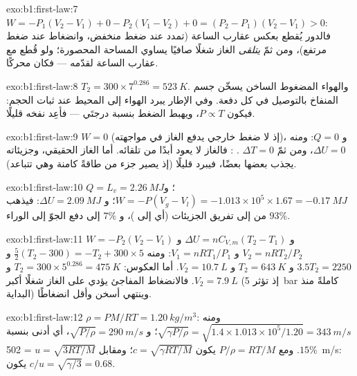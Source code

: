 \begin{solution}{exo:b1:first-law:7}
$W = -P_1(V_2 - V_1) + 0 - P_2(V_1 - V_2) + 0 = (P_2 - P_1)(V_2 - V_1) > 0$:
فالدور يُقطع بعكس عقارب الساعة (تمدد عند ضغط منخفض،
وانضغاط عند ضغط مرتفع)، ومن ثمّ \emph{يتلقى} الغاز شغلًا صافيًا يساوي
المساحة المحصورة؛ ولو قُطع مع عقارب الساعة لقدّمه --- فكان محركًا.
\end{solution}

\begin{solution}{exo:b1:first-law:8}
$T_2 = 300 \times 7^{0.286} = \qty{523}{K}$. والهواء المضغوط الساخن يسخّن
جسم المنفاخ بالتوصيل في كل دفعة. وفي الإطار يبرد الهواء إلى
 المحيط عند ثبات الحجم: فيكون $P \propto T$، ويهبط الضغط بنسبة
درجتَي  --- فأعِد نفخه قليلًا.
\end{solution}

\begin{solution}{exo:b1:first-law:9}
$W = 0$ (إذ لا ضغط خارجي يدفع الغاز في مواجهته)، و $Q = 0$: ومنه $\Delta U = 0$،
ومن ثمّ $\Delta T = 0$ . : فالغاز لا يعود
أبدًا من تلقائه. أما الغاز الحقيقي، وجزيئاته يجذب بعضها بعضًا، فيبرد قليلًا
(إذ يصير جزء من  طاقةً كامنة وهي تتباعد).
\end{solution}

\begin{solution}{exo:b1:first-law:10}
$Q = L_v = \qty{2.26}{MJ}$؛ و $W = -P(V_g - V_l) = -1.013\times10^5 \times 1.67 =
\qty{-0.17}{MJ}$؛ و $\Delta U = \qty{2.09}{MJ}$: فيذهب $93\%$ من  إلى
تفريق الجزيئات (أي إلى )، و $7\%$ إلى دفع
الجوّ إلى الوراء.
\end{solution}

\begin{solution}{exo:b1:first-law:11}
$W = -P_2(V_2 - V_1)$ و $\Delta U = nC_{V,m}(T_2 - T_1)$ و $V_2 = nRT_2/P_2$ و $V_1
= nRT_1/P_1$: ومنه $\tfrac52(T_2 - 300) = -T_2 + 300 \times 5$ و $3.5T_2 = 2250$
و $T_2 = \qty{643}{K}$ و $V_2 = \qty{10.7}{L}$. أما العكوس: $T_2 = 300 \times
5^{0.286} = \qty{475}{K}$ و $V_2 = \qty{7.9}{L}$. فالانضغاط المفاجئ يؤدي على
الغاز شغلًا أكبر (إذ تؤثر \qty{5}{bar} كاملةً منذ البداية) وينتهي
أسخن وأقل انضغاطًا.
\end{solution}

\begin{solution}{exo:b1:first-law:12}
$\rho = PM/RT = \qty{1.20}{kg/m^3}$: ومنه $\sqrt{\gamma P/\rho} = \sqrt{1.4 \times
1.013\times10^5/1.20} = \qty{343}{m/s}$؛ و $\sqrt{P/\rho} = \qty{290}{m/s}$، أي أدنى بنسبة $15\%$.
ومع $P/\rho = RT/M$ يكون $c = \sqrt{\gamma RT/M}$؛ ومقابل $u = \sqrt{3RT/M}$
= \qty{502}{m/s}: يكون $c/u = \sqrt{\gamma/3} = 0.68$.
\end{solution}

